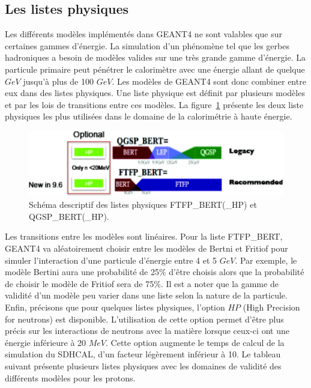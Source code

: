 \subsection{Les listes physiques}
\label{sec.listPhys}
Les différents modèles implémentés dans GEANT4 ne sont valables que sur certaines gammes d'énergie. La simulation d'un phénomène tel que les gerbes hadroniques a besoin de modèles valides sur une très grande gamme d'énergie. La particule primaire peut pénétrer le calorimètre avec une énergie allant de quelque $GeV$ jusqu'à plus de 100 $GeV$. Les modèles de GEANT4 sont donc combiner entre eux dans des listes physiques. Une liste physique est définit par plusieurs modèles et par les lois de transitions entre ces modèles. La figure~\ref{fig.g4list} présente les deux liste physiques les plus utilisées dans le domaine de la calorimétrie à haute énergie. 
\label{sec.listphys}
\begin{figure}[!ht]
  \begin{center}
    \includegraphics[width=.8\textwidth]{Digitizer/figs/physics_list_G4.pdf}
    \caption{Schéma descriptif des listes physiques FTFP\_BERT(\_HP) et QGSP\_BERT(\_HP).}
    \label{fig.g4list}
  \end{center}
\end{figure}
Les transitions entre les modèles sont linéaires. Pour la liste FTFP\_BERT, GEANT4 va aléatoirement choisir entre les modèles de Bertni et Fritiof pour simuler l’interaction d'une particule d'énergie entre 4 et 5 $GeV$. Par exemple, le modèle Bertini aura une probabilité de 25$\%$ d'être choisis alors que la probabilité de choisir le modèle de Fritiof sera de 75$\%$. Il est a noter que la gamme de validité d'un modèle peu varier dans une liste selon la nature de la particule. Enfin, précisons que pour quelques listes physiques, l'option $HP$ (High Precision for neutrons) est disponible. L'utilisation de cette option permet d'être plus précis sur les interactions de neutrons avec la matière lorsque ceux-ci ont une énergie inférieure à 20 $MeV$. Cette option augmente le temps de calcul de la simulation du SDHCAL, d'un facteur légèrement inférieur à 10. Le tableau suivant présente plusieurs listes physiques avec les domaines de validité des différents modèles pour les protons.

